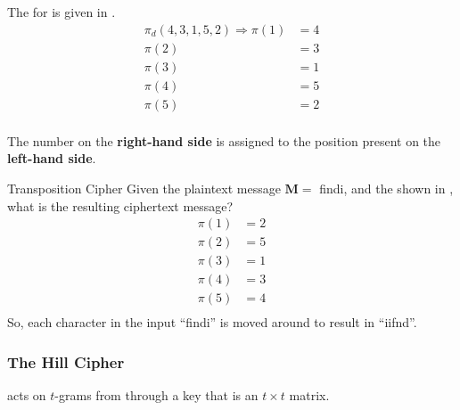The  for  is given in .
\begin{equation}\label{eq:Transposition_Cipher-Decryption}
  \begin{aligned}
    \pi_{d}(4, 3, 1, 5, 2) \Longrightarrow \pi(1) &= 4 \\
    \pi(2) &= 3 \\
    \pi(3) &= 1 \\
    \pi(4) &= 5 \\
    \pi(5) &= 2 \\
  \end{aligned}
\end{equation}

\begin{remark}
  The number on the \textbf{right-hand side} is assigned to the position present on the \textbf{left-hand side}.
\end{remark}

\begin{example}[Lecture 5]{Transposition Cipher}
  Given the plaintext message $\mathbf{M}=$ findi, and the  shown in , what is the resulting ciphertext message?
  \tcblower{}
  \begin{align*}
    \pi(1) &= 2 \\
    \pi(2) &= 5 \\
    \pi(3) &= 1 \\
    \pi(4) &= 3 \\
    \pi(5) &= 4 \\
  \end{align*}
  So, each character in the input ``findi'' is moved around to result in ``iifnd''.
\end{example}

\subsubsection{The Hill Cipher}\label{subsubsec:The_Hill_Cipher}
 acts on $t$-grams from  through a key that is an  $t \times t$ matrix.

